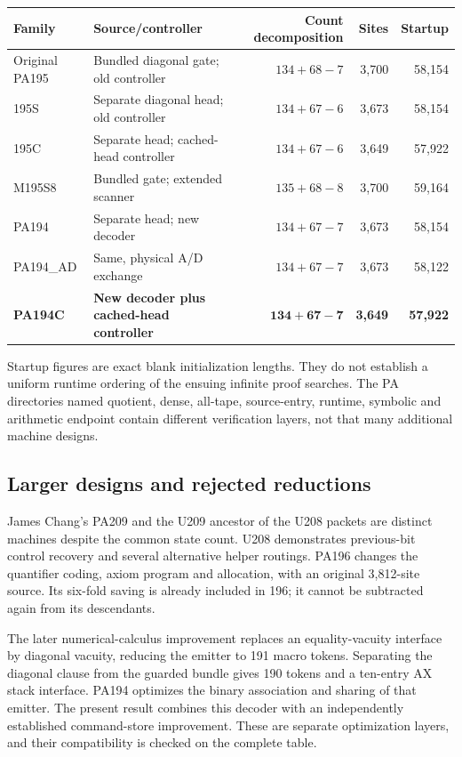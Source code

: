 \documentclass[11pt,letterpaper]{article}
\begin{document}
\begin{center}\small
\begin{tabularx}{\linewidth}{@{}lXrrr@{}}
\toprule
Family & Source/controller & Count decomposition & Sites & Startup\\
\midrule
Original PA195 & Bundled diagonal gate; old controller & $134+68-7$ &3,700&58,154\\
195S & Separate diagonal head; old controller & $134+67-6$ &3,673&58,154\\
195C & Separate head; cached-head controller & $134+67-6$ &3,649&57,922\\
M195S8 & Bundled gate; extended scanner & $135+68-8$ &3,700&59,164\\
PA194 & Separate head; new decoder & $134+67-7$ &3,673&58,154\\
PA194\_AD & Same, physical A/D exchange & $134+67-7$ &3,673&58,122\\
\textbf{PA194C} & \textbf{New decoder plus cached-head controller} & $\mathbf{134+67-7}$ &\textbf{3,649}&\textbf{57,922}\\
\bottomrule
\end{tabularx}
\end{center}

Startup figures are exact blank initialization lengths. They do not establish
a uniform runtime ordering of the ensuing infinite proof searches.
The PA directories named quotient, dense, all-tape, source-entry, runtime,
symbolic and arithmetic endpoint contain different verification layers, not
that many additional machine designs.

\subsection{Larger designs and rejected reductions}

James Chang's PA209 and the U209 ancestor of the U208 packets are distinct
machines despite the common state count. U208 demonstrates previous-bit
control recovery and several alternative helper routings. PA196 changes the
quantifier coding, axiom program and allocation, with an original 3,812-site
source. Its six-fold saving is already included in 196; it cannot be subtracted
again from its descendants.

The later numerical-calculus improvement replaces an equality-vacuity
interface by diagonal vacuity, reducing the emitter to 191 macro tokens.
Separating the diagonal clause from the guarded bundle gives 190 tokens and
a ten-entry AX stack interface. PA194 optimizes the binary association and
sharing of that emitter. The present result combines this decoder with an
independently established command-store improvement. These are separate
optimization layers, and their compatibility is checked on the complete table.
\end{document}
